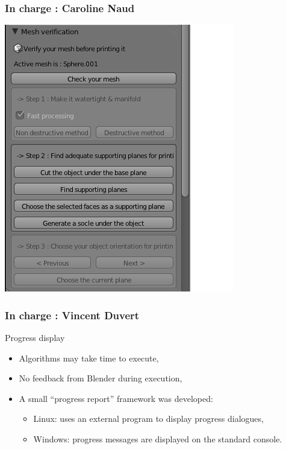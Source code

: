 \documentclass{beamer}
\begin{document}
\begin{frame}
	\frametitle{In charge : Caroline Naud}
    \begin{center}
		\includegraphics[height=.8\textheight]{Panel}
	\end{center}
\end{frame}

\begin{frame}
	\frametitle{In charge : Vincent Duvert}
    \begin{block}{Progress display}
	\begin{itemize}
	\item Algorithms may take time to execute,
	\item No feedback from Blender during execution,
	\item A small ``progress report'' framework was developed:
	\begin{itemize}
		\item Linux: uses an external program to display progress dialogues,
		\item Windows: progress messages are displayed on the standard console.
	\end{itemize}
	\end{itemize}
    \end{block}
\end{frame}
\end{document}

